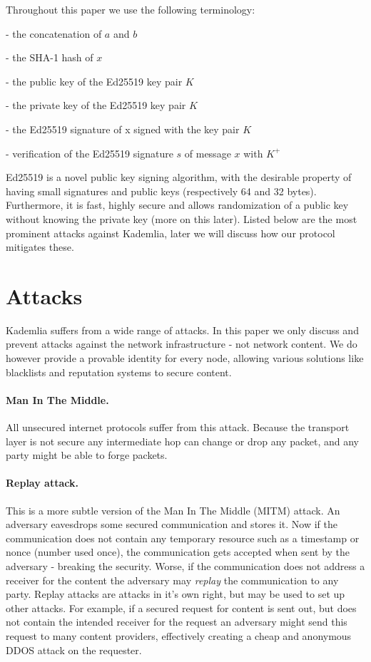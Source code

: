 \documentclass[12pt]{article}
\begin{document}
Throughout this paper we use the following terminology:

\begin{description}[noitemsep]
    \item[$a || b$] - the concatenation of $a$ and $b$
    \item[$H(x)$] - the SHA-1 hash of $x$
    \item[$K^+$] - the public key of the Ed25519 key pair $K$
    \item[$K^-$] - the private key of the Ed25519 key pair $K$
    \item[$Sign(x, K)$] - the Ed25519 signature of x signed with the key pair $K$
    \item[$Verify(s, x, K^+)$] - verification of the Ed25519 signature $s$ of message $x$ with $K^+$
\end{description}

Ed25519 \cite{bernstein2011high} is a novel public key signing algorithm, with
the desirable property of having small signatures and public keys (respectively
64 and 32 bytes). Furthermore, it is fast, highly secure and allows
randomization of a public key without knowing the private key (more on this
later). Listed below are the most prominent attacks against Kademlia, later we
will discuss how our protocol mitigates these.


\section{Attacks}
Kademlia suffers from a wide range of attacks. In this paper
we only discuss and prevent attacks against the network infrastructure - not
network content. We do however provide a provable identity for every node,
allowing various solutions like blacklists and reputation systems to secure
content.

\paragraph{Man In The Middle.} All unsecured internet protocols suffer from
this attack. Because the transport layer is not secure any intermediate hop can
change or drop any packet, and any party might be able to forge packets.

\paragraph{Replay attack.} This is a more subtle version of the Man In The
Middle (MITM) attack. An adversary eavesdrops some secured communication and
stores it. Now if the communication does not contain any temporary resource
such as a timestamp or nonce (number used once), the communication gets
accepted when sent by the adversary - breaking the security. Worse, if the
communication does not address a receiver for the content the adversary may
\emph{replay} the communication to any party. Replay attacks are attacks in
it's own right, but may be used to set up other attacks. For example, if a
secured request for content is sent out, but does not contain the intended
receiver for the request an adversary might send this request to many content
providers, effectively creating a cheap and anonymous DDOS attack on the
requester.
\end{document}
